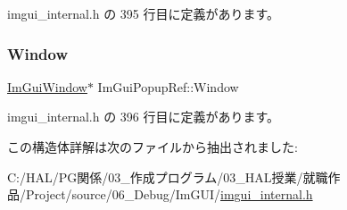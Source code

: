  imgui\+\_\+internal.\+h の 395 行目に定義があります。

\mbox{\label{struct_im_gui_popup_ref_a471027209038d1d59280a84c8d236f34}} 
\subsubsection{\texorpdfstring{Window}{Window}}
{\footnotesize\ttfamily \mbox{\hyperlink{struct_im_gui_window}{Im\+Gui\+Window}}$\ast$ Im\+Gui\+Popup\+Ref\+::\+Window}



 imgui\+\_\+internal.\+h の 396 行目に定義があります。



この構造体詳解は次のファイルから抽出されました\+:\begin{DoxyCompactItemize}
\item 
C\+:/\+H\+A\+L/\+P\+G関係/03\+\_\+作成プログラム/03\+\_\+\+H\+A\+L授業/就職作品/\+Project/source/06\+\_\+\+Debug/\+Im\+G\+U\+I/\mbox{\hyperlink{imgui__internal_8h}{imgui\+\_\+internal.\+h}}\end{DoxyCompactItemize}
